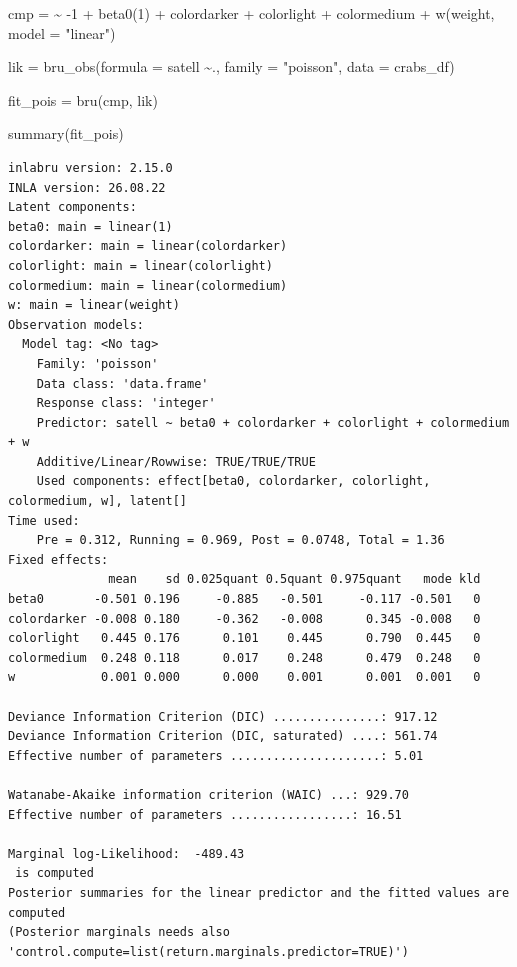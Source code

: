 \documentclass[
  letterpaper,
  DIV=11,
  numbers=noendperiod]{scrartcl}
\newenvironment{Shaded}{\begin{snugshade}}{\end{snugshade}}
\newcommand{\AttributeTok}[1]{\textcolor[rgb]{0.40,0.45,0.13}{#1}}
\newcommand{\DecValTok}[1]{\textcolor[rgb]{0.68,0.00,0.00}{#1}}
\newcommand{\ErrorTok}[1]{\textcolor[rgb]{0.68,0.00,0.00}{#1}}
\newcommand{\FunctionTok}[1]{\textcolor[rgb]{0.28,0.35,0.67}{#1}}
\newcommand{\NormalTok}[1]{\textcolor[rgb]{0.00,0.23,0.31}{#1}}
\newcommand{\OtherTok}[1]{\textcolor[rgb]{0.00,0.23,0.31}{#1}}
\newcommand{\SpecialCharTok}[1]{\textcolor[rgb]{0.37,0.37,0.37}{#1}}
\newcommand{\StringTok}[1]{\textcolor[rgb]{0.13,0.47,0.30}{#1}}
\begin{document}
\begin{Shaded}
\begin{Highlighting}[]
\NormalTok{cmp }\OtherTok{=}  \ErrorTok{\textasciitilde{}} \SpecialCharTok{{-}}\DecValTok{1} \SpecialCharTok{+} \FunctionTok{beta0}\NormalTok{(}\DecValTok{1}\NormalTok{) }\SpecialCharTok{+}\NormalTok{  colordarker }\SpecialCharTok{+}
\NormalTok{       colorlight }\SpecialCharTok{+}\NormalTok{ colormedium }\SpecialCharTok{+}
       \FunctionTok{w}\NormalTok{(weight, }\AttributeTok{model =} \StringTok{"linear"}\NormalTok{)}

\NormalTok{lik }\OtherTok{=}  \FunctionTok{bru\_obs}\NormalTok{(}\AttributeTok{formula =}\NormalTok{ satell }\SpecialCharTok{\textasciitilde{}}\NormalTok{.,}
            \AttributeTok{family =} \StringTok{"poisson"}\NormalTok{,}
            \AttributeTok{data =}\NormalTok{ crabs\_df)}

\NormalTok{fit\_pois }\OtherTok{=} \FunctionTok{bru}\NormalTok{(cmp, lik)}

\FunctionTok{summary}\NormalTok{(fit\_pois)}
\end{Highlighting}
\end{Shaded}

\begin{verbatim}
inlabru version: 2.15.0 
INLA version: 26.08.22 
Latent components:
beta0: main = linear(1)
colordarker: main = linear(colordarker)
colorlight: main = linear(colorlight)
colormedium: main = linear(colormedium)
w: main = linear(weight)
Observation models:
  Model tag: <No tag>
    Family: 'poisson'
    Data class: 'data.frame'
    Response class: 'integer'
    Predictor: satell ~ beta0 + colordarker + colorlight + colormedium + w
    Additive/Linear/Rowwise: TRUE/TRUE/TRUE
    Used components: effect[beta0, colordarker, colorlight, colormedium, w], latent[] 
Time used:
    Pre = 0.312, Running = 0.969, Post = 0.0748, Total = 1.36 
Fixed effects:
              mean    sd 0.025quant 0.5quant 0.975quant   mode kld
beta0       -0.501 0.196     -0.885   -0.501     -0.117 -0.501   0
colordarker -0.008 0.180     -0.362   -0.008      0.345 -0.008   0
colorlight   0.445 0.176      0.101    0.445      0.790  0.445   0
colormedium  0.248 0.118      0.017    0.248      0.479  0.248   0
w            0.001 0.000      0.000    0.001      0.001  0.001   0

Deviance Information Criterion (DIC) ...............: 917.12
Deviance Information Criterion (DIC, saturated) ....: 561.74
Effective number of parameters .....................: 5.01

Watanabe-Akaike information criterion (WAIC) ...: 929.70
Effective number of parameters .................: 16.51

Marginal log-Likelihood:  -489.43 
 is computed 
Posterior summaries for the linear predictor and the fitted values are computed
(Posterior marginals needs also 'control.compute=list(return.marginals.predictor=TRUE)')
\end{verbatim}
\end{document}
